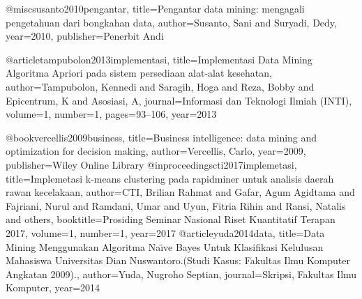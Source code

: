 @misc{susanto2010pengantar,
  title={Pengantar data mining: mengagali pengetahuan dari bongkahan data},
  author={Susanto, Sani and Suryadi, Dedy},
  year={2010},
  publisher={Penerbit Andi}
}

@article{tampubolon2013implementasi,
  title={Implementasi Data Mining Algoritma Apriori pada sistem persediaan alat-alat kesehatan},
  author={Tampubolon, Kennedi and Saragih, Hoga and Reza, Bobby and Epicentrum, K and Asosiasi, A},
  journal={Informasi dan Teknologi Ilmiah (INTI)},
  volume={1},
  number={1},
  pages={93--106},
  year={2013}
}

@book{vercellis2009business,
  title={Business intelligence: data mining and optimization for decision making},
  author={Vercellis, Carlo},
  year={2009},
  publisher={Wiley Online Library}
}
@inproceedings{cti2017implemetasi,
  title={Implemetasi k-means clustering pada rapidminer untuk analisis daerah rawan kecelakaan},
  author={CTI, Brilian Rahmat and Gafar, Agum Agidtama and Fajriani, Nurul and Ramdani, Umar and Uyun, Fitria Rihin and Ransi, Natalis and others},
  booktitle={Prosiding Seminar Nasional Riset Kuantitatif Terapan 2017},
  volume={1},
  number={1},
  year={2017}
}
@article{yuda2014data,
  title={Data Mining Menggunakan Algoritma Na{\"\i}ve Bayes Untuk Klasifikasi Kelulusan Mahasiswa Universitas Dian Nuswantoro.(Studi Kasus: Fakultas Ilmu Komputer Angkatan 2009).},
  author={Yuda, Nugroho Septian},
  journal={Skripsi, Fakultas Ilmu Komputer},
  year={2014}
}

